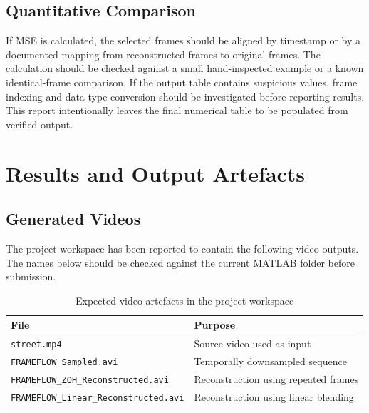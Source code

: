 \documentclass[12pt,a4paper,oneside]{report}
\begin{document}
\section{Quantitative Comparison}
If MSE is calculated, the selected frames should be aligned by timestamp or by a documented mapping from reconstructed frames to original frames. The calculation should be checked against a small hand-inspected example or a known identical-frame comparison. If the output table contains suspicious values, frame indexing and data-type conversion should be investigated before reporting results. This report intentionally leaves the final numerical table to be populated from verified output.

\chapter{Results and Output Artefacts}
\section{Generated Videos}
The project workspace has been reported to contain the following video outputs. The names below should be checked against the current MATLAB folder before submission.
\begin{table}[H]
\centering
\caption{Expected video artefacts in the project workspace}
\begin{tabular}{p{}p{}}
\toprule
\textbf{File} & \textbf{Purpose}\\
\midrule
\texttt{street.mp4} & Source video used as input\\
\texttt{FRAMEFLOW\_Sampled.avi} & Temporally downsampled sequence\\
\texttt{FRAMEFLOW\_ZOH\_Reconstructed.avi} & Reconstruction using repeated frames\\
\texttt{FRAMEFLOW\_Linear\_Reconstructed.avi} & Reconstruction using linear blending\\
\bottomrule
\end{tabular}
\end{table}
\end{document}
